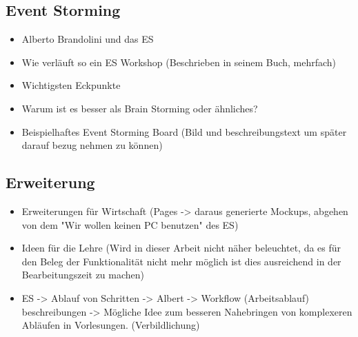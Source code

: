 \subsection{Event Storming}\label{subsec:allgemein}
\begin{itemize}
    \item Alberto Brandolini und das ES
    \item Wie verläuft so ein ES Workshop (Beschrieben in seinem Buch, mehrfach)
    \item Wichtigsten Eckpunkte
    \item Warum ist es besser als Brain Storming oder ähnliches?
    \item Beispielhaftes Event Storming Board (Bild und beschreibungstext um später darauf bezug nehmen zu können)
\end{itemize}

\subsection{Erweiterung}\label{subsec:erweiterung}
\begin{itemize}
    \item Erweiterungen für Wirtschaft (Pages -> daraus generierte Mockups, abgehen von dem "Wir wollen keinen PC benutzen" des ES)
    \item Ideen für die Lehre (Wird in dieser Arbeit nicht näher beleuchtet, da es für den Beleg der Funktionalität nicht mehr möglich ist dies ausreichend in der Bearbeitungszeit zu machen)
    \item ES -> Ablauf von Schritten -> Albert -> Workflow (Arbeitsablauf) beschreibungen -> Mögliche Idee zum besseren Nahebringen von komplexeren Abläufen in Vorlesungen. (Verbildlichung)
\end{itemize}
